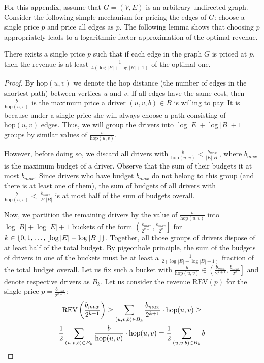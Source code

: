 \label{sec:single_price}

For this appendix, assume that $G = (V, E)$ is an arbitrary undirected graph. Consider the following simple mechanism for pricing the edges of $G$: choose a single price $p$ and price all edges as $p$. The following lemma shows that choosing $p$ appropriately leads to a logarithmic-factor approximation of the optimal revenue.

\begin{lemma}
There exists a single price $p$ such that if each edge
in the graph $G$ is priced at $p$, then the revenue is at least $\frac{1}{4 (\log |E| + \log |B| + 1)}$ of the optimal one.
\end{lemma}
\begin{proof}
    By $\mathrm{hop}(u, v)$ we denote the hop distance (the number of edges in the shortest path) between vertices $u$ and $v$.
    If all edges have the same cost, then $\frac{b}{\mathrm{hop}(u, v)}$ is the maximum price a driver $(u, v, b) \in B$ is willing to pay.
    It is because under a single price she will always choose a path consisting of $\mathrm{hop}(u, v)$ edges.
    Thus, we will group the drivers into $\log |E| + \log |B| + 1$ groups by similar values of $\frac{b}{\mathrm{hop}(u, v)}$.
    
    However, before doing so, we discard all drivers with $\frac{b}{\mathrm{hop}(u, v)} < \frac{b_{max}}{|E| |B|}$,
    where $b_{max}$ is the maximum budget of a driver.
    Observe that the sum of their budgets it at most $b_{max}$.
    Since drivers who have budget $b_{max}$ do not belong to this group (and there is at least one of them), the sum of budgets of all drivers
    with $\frac{b}{\mathrm{hop}(u, v)} < \frac{b_{max}}{|E| |B|}$ is at most half of the sum of budgets overall.

    Now, we partition the remaining drivers by the value of $\frac{b}{\mathrm{hop}(u, v)}$
    into $\log |B| + \log |E| + 1$ buckets of the form $\left( \frac{b_{max}}{2^{k+1}}, \frac{b_{max}}{2^k}\right]$ for
    $k \in \left\{ 0, 1, \ldots, \left\lfloor \log |E| + \log |B| \right\rfloor \right\}$.
    Together, all those groups of drivers dispose of at least half of the total budget.
    By pigeonhole principle, the sum of the budgets of drivers in one of the buckets must be at least a
    $\frac{1}{2(\log |E| + \log |B| + 1)}$ fraction of the total budget overall.
    Let us fix such a bucket with $\frac{b}{\mathrm{hop}(u, v)} \in \left( \frac{b_{max}}{2^{k+1}}, \frac{b_{max}}{2^k}\right]$
    and denote respective drivers as $B_k$.
    Let us consider the revenue $\mathrm{REV}(p)$ for the single price $p = \frac{b_{max}}{2^{k+1}}$:
    \begin{gather*} \mathrm{REV}\left( \frac{b_{max}}{2^{k+1}} \right)
    \geq \sum_{(u, v, b) \in B_k} \frac{b_{max}}{2^{k+1}} \cdot \mathrm{hop}(u, v) \geq
    \\ \frac{1}{2} \sum_{(u, v, b) \in B_k} \frac{b}{\mathrm{hop}(u, v)} \cdot \mathrm{hop}(u, v)
    = \frac{1}{2} \sum_{(u, v, b) \in B_k} b
    \end{gather*}


\end{proof}
